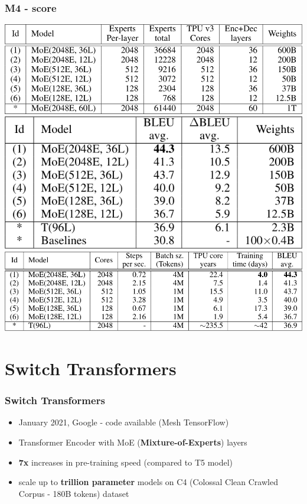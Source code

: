 \documentclass{beamer}
\begin{document}
\begin{frame}
    \frametitle{M4 - score}
    \begin{center}
        \includegraphics[scale=0.24]{img/gshard_models.png}
        \includegraphics[scale=0.24]{img/gshard_score.png}
        \includegraphics[scale=0.21]{img/gshard_score_2.png}
    \end{center}
\end{frame}



\section{Switch Transformers}
\begin{frame}
    \frametitle{Switch Transformers \cite{switch_transformer}}
    \begin{itemize}
        \item January 2021, Google - code available (Mesh TensorFlow)
        \item Transformer Encoder with MoE (\textbf{Mixture-of-Experts}) layers
        \item \textbf{7x} increases in pre-training speed (compared to T5 model)
        \item scale up to \textbf{trillion parameter} models on C4 (Colossal Clean Crawled Corpus - 180B tokens) dataset
    \end{itemize}
\end{frame}
\end{document}
